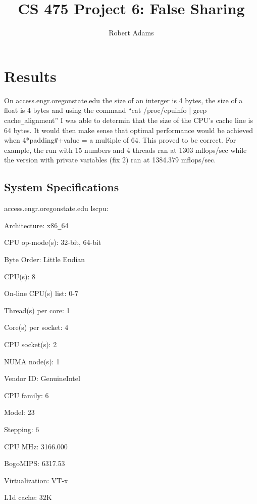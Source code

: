 \documentclass[letterpaper,10pt]{article} %
\begin{document}
\title{CS 475 Project 6: False Sharing} 
\author{Robert Adams}
\maketitle



\section{Results}

On access.engr.oregonstate.edu the size of an interger is 4 bytes,
the size of a float is 4 bytes and using the command “cat /proc/cpuinfo
| grep cache\verb|_|alignment” I was able to determin that the size of the
CPU’s cache line is 64 bytes. It would then make sense that optimal
performance would be achieved when 4*padding\verb|#|+value = a multiple of
64. This proved to be correct. For example, the run with 15 numbers
and 4 threads ran at 1303 mflops/sec while the version with private
variables (fix 2) ran at 1384.379 mflops/sec.


\subsection{System Specifications}

access.engr.oregonstate.edu   lscpu:

Architecture:          x86\verb|_|64

CPU op-mode(s):        32-bit, 64-bit

Byte Order:            Little Endian

CPU(s):                8

On-line CPU(s) list:   0-7

Thread(s) per core:    1

Core(s) per socket:    4

CPU socket(s):         2

NUMA node(s):          1

Vendor ID:             GenuineIntel

CPU family:            6

Model:                 23

Stepping:              6

CPU MHz:               3166.000

BogoMIPS:              6317.53

Virtualization:        VT-x

L1d cache:             32K
\end{document}
